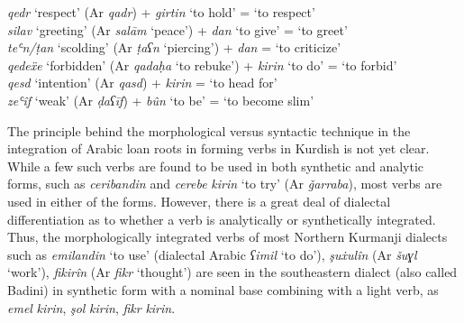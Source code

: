 \documentclass[output=paper]{langsci/langscibook}
\begin{document}
\ea
\textit{qedr} ‘respect’              (Ar \textit{qadr})                +   \textit{girtin} ‘to hold’    =  ‘to respect’     \\
\textit{silav} ‘greeting’            (Ar \textit{salām} ‘peace’)       +   \textit{dan} ‘to give’       =   ‘to greet’      \\
\textit{teʿn\slash ṭan} ‘scolding’   (Ar \textit{ṭaʕn} ‘piercing’)     + \textit{dan}                   =   ‘to criticize’  \\
\textit{qedeẍe} ‘forbidden’          (Ar \textit{qadaḥa} ‘to rebuke’)  +   \textit{kirin} ‘to do’       =   ‘to forbid’     \\
\textit{qesd} ‘intention’            (Ar \textit{qasd})                +   \textit{kirin}               =   ‘to head for’   \\
\textit{zeʿîf} ‘weak’                (Ar \textit{ḍaʕīf})               +   \textit{bûn} ‘to be’         =   ‘to become slim’
\z

The principle behind the morphological versus syntactic technique in the integration of Arabic loan roots in forming verbs in Kurdish is not yet clear. While a few such verbs are found to be used in both synthetic and analytic forms, such as \textit{ceribandin} and \textit{cerebe} \textit{kirin} ‘to try’ (Ar \textit{ǧarraba}), most verbs are used in either of the forms. However, there is a great deal of dialectal differentiation as to whether a verb is analytically or synthetically integrated. Thus, the morphologically integrated verbs of most Northern Kurmanji dialects such as \textit{emilandin} ‘to use’ (dialectal Arabic \textit{ʕimil} ‘to do’), \textit{şuẋulîn} (Ar \textit{šuɣl} ‘work’), \textit{fikirîn} (Ar \textit{fikr} ‘thought’) are seen in the southeastern dialect (also called Badini) in synthetic form with a nominal base combining with a light verb, as \textit{emel} \textit{kirin}, \textit{şol} \textit{kirin}, \textit{fikr} \textit{kirin}.   
\end{document}
